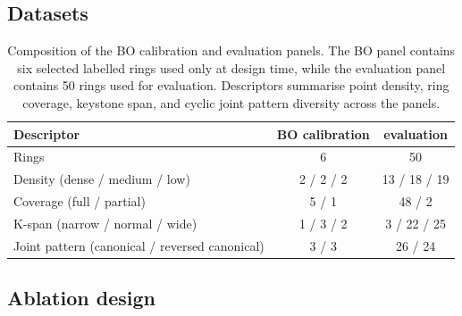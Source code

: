 \documentclass[a4paper,fleqn]{cas-dc}
\begin{document}
{\subsection{Datasets}\label{subsec:datasets}
\begin{table}[t]
\caption{Composition of the BO calibration and evaluation panels. The BO panel contains six selected labelled rings used only at design time, while the evaluation panel contains 50 rings used for evaluation. Descriptors summarise point density, ring coverage, keystone span, and cyclic joint pattern diversity across the panels.}
\label{tab:dataset_panels}
\centering
\footnotesize
\begin{tabular}{lcc}
\toprule
Descriptor & BO calibration & evaluation \\
\midrule
Rings & 6 & 50 \\
Density (dense / medium / low) & 2 / 2 / 2 & 13 / 18 / 19 \\
Coverage (full / partial) & 5 / 1 & 48 / 2 \\
K-span (narrow / normal / wide) & 1 / 3 / 2 & 3 / 22 / 25 \\
Joint pattern (canonical / reversed canonical) & 3 / 3 & 26 / 24 \\
\bottomrule
\end{tabular}
\end{table}

\subsection{Ablation design}\label{subsec:proxy_ablation_design}

\begin{figure}[t]
\centering
{}
\end{figure}}
\end{document}
